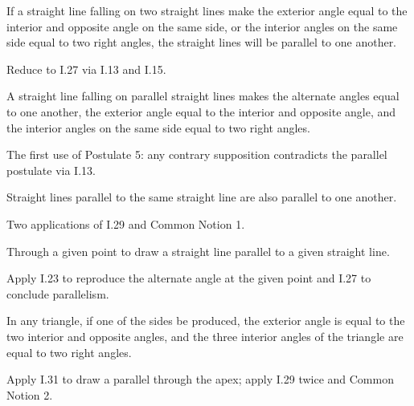 \begin{claim}
\label{prop:I.28}
If a straight line falling on two straight lines make the exterior
angle equal to the interior and opposite angle on the same side, or
the interior angles on the same side equal to two right angles, the
straight lines will be parallel to one another.
\end{claim}
\begin{evidence}[Proof of I.28]
\label{ev:I.28}
Reduce to I.27 via I.13 and I.15.
\end{evidence}

\begin{claim}
\label{prop:I.29}
A straight line falling on parallel straight lines makes the alternate
angles equal to one another, the exterior angle equal to the interior
and opposite angle, and the interior angles on the same side equal to
two right angles.
\end{claim}
\begin{evidence}[Proof of I.29]
\label{ev:I.29}
The first use of Postulate 5: any contrary supposition contradicts the
parallel postulate via I.13.
\end{evidence}

\begin{claim}
\label{prop:I.30}
Straight lines parallel to the same straight line are also parallel
to one another.
\end{claim}
\begin{evidence}[Proof of I.30]
\label{ev:I.30}
Two applications of I.29 and Common Notion 1.
\end{evidence}

\begin{claim}
\label{prop:I.31}
Through a given point to draw a straight line parallel to a given
straight line.
\end{claim}
\begin{evidence}[Proof of I.31]
\label{ev:I.31}
Apply I.23 to reproduce the alternate angle at the given point and
I.27 to conclude parallelism.
\end{evidence}

\begin{claim}
\label{prop:I.32}
In any triangle, if one of the sides be produced, the exterior angle
is equal to the two interior and opposite angles, and the three
interior angles of the triangle are equal to two right angles.
\end{claim}
\begin{evidence}[Proof of I.32]

\label{ev:I.32}
Apply I.31 to draw a parallel through the apex; apply I.29 twice and
Common Notion 2.
\end{evidence}


